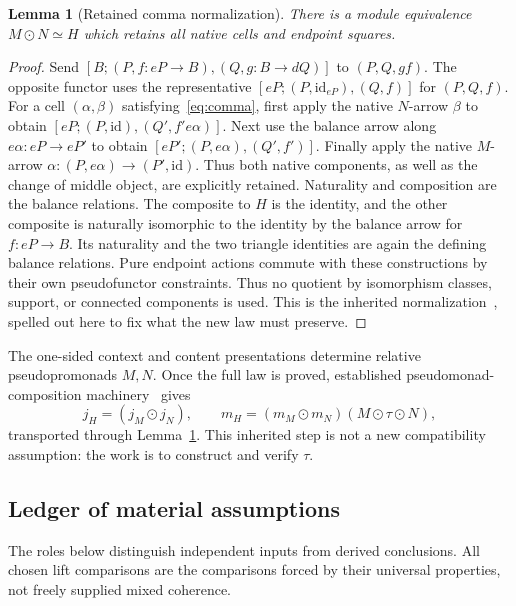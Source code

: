 \documentclass[11pt,a4paper]{article}
\newtheorem{lemma}[theorem]{Lemma}
\theoremstyle{definition}
\newcommand{\id}{\mathrm{id}}
\begin{document}
\begin{lemma}[Retained comma normalization]\label{lem:normalization}
There is a module equivalence $M\odot N\simeq H$ which retains all native
cells and endpoint squares.
\end{lemma}
\begin{proof}
Send $[B;(P,f:eP\to B),(Q,g:B\to dQ)]$ to $(P,Q,gf)$.
The opposite functor uses the representative
$[eP;(P,\id_{eP}),(Q,f)]$ for $(P,Q,f)$. For a cell $(\alpha,\beta)$ satisfying~\eqref{eq:comma}, first apply the
native $N$-arrow $\beta$ to obtain
$[eP;(P,\id),(Q',f'e\alpha)]$. Next use the balance arrow along
$e\alpha:eP\to eP'$ to obtain
$[eP';(P,e\alpha),(Q',f')]$. Finally apply the native $M$-arrow
$\alpha:(P,e\alpha)\to(P',\id)$. Thus both native components, as well as
the change of middle object, are explicitly retained. Naturality
and composition are the balance relations. The composite to $H$ is the
identity, and the other composite is naturally isomorphic to the identity by
the balance arrow for $f:eP\to B$. Its naturality and the two triangle
identities are again the defining balance relations. Pure endpoint actions
commute with these constructions by their own pseudofunctor constraints.
Thus no quotient by isomorphism classes, support, or connected components is
used. This is the inherited normalization~\cite{Unified}, spelled out here to
fix what the new law must preserve.
\end{proof}

The one-sided context and content presentations determine relative
pseudopromonads $M,N$. Once the full law is proved, established
pseudomonad-composition machinery~\cite{Marmolejo,GambinoLobbia} gives
\begin{equation}\label{eq:composite}
 j_H=(j_M\odot j_N),\qquad
 m_H=(m_M\odot m_N)(M\odot\tau\odot N),
\end{equation}
transported through Lemma~\ref{lem:normalization}. This inherited step is not
a new compatibility assumption: the work is to construct and verify $\tau$.

\subsection{Ledger of material assumptions}
The roles below distinguish independent inputs from derived conclusions.
All chosen lift comparisons are the comparisons forced by their universal
properties, not freely supplied mixed coherence.
\end{document}
